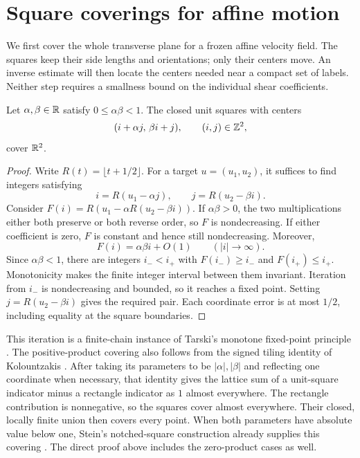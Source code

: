 \section{Square coverings for affine motion}\label{b:linear-coverings}

We first cover the whole transverse plane for a frozen affine velocity
field. The squares keep their side lengths and orientations; only their
centers move. An inverse estimate will then locate the centers needed
near a compact set of labels. Neither step requires a smallness bound on the
individual shear coefficients.

\begin{lemma}\label{b:lattice}
Let $\alpha,\beta\in\mathbb R$ satisfy $0\le\alpha\beta<1$.
The closed unit squares with centers
\[
 (i+\alpha j,\,\beta i+j),\qquad (i,j)\in\mathbb Z^2,
\]
cover $\mathbb R^2$.
\end{lemma}
\begin{proof}
Write $R(t)=\lfloor t+1/2\rfloor$. For a target $u=(u_1,u_2)$,
it suffices to find integers satisfying
\[
 i=R(u_1-\alpha j),\qquad j=R(u_2-\beta i).
\]
Consider $F(i)=R(u_1-\alpha R(u_2-\beta i))$. If
$\alpha\beta>0$, the two multiplications either both preserve or
both reverse order, so $F$ is nondecreasing. If either coefficient
is zero, $F$ is constant and hence still nondecreasing. Moreover,
\[
 F(i)=\alpha\beta i+O(1)\qquad(|i|\to\infty).
\]
Since $\alpha\beta<1$, there are integers $i_-<i_+$ with
$F(i_-)\ge i_-$ and $F(i_+)\le i_+$. Monotonicity makes the
finite integer interval between them invariant. Iteration from $i_-$
is nondecreasing and bounded, so it reaches a fixed point. Setting
$j=R(u_2-\beta i)$ gives the required pair. Each coordinate error
is at most $1/2$, including equality at the square boundaries.
\end{proof}

This iteration is a finite-chain instance of Tarski's monotone
fixed-point principle \cite[Theorem~1]{Tarski1955}. The positive-product
covering also follows from the signed tiling identity of Kolountzakis
\cite[Section~2.3, equations~(17)--(20)]{Kolountzakis1998}.
After taking its parameters to be $|\alpha|,|\beta|$ and reflecting
one coordinate when necessary, that identity gives the lattice sum of
a unit-square indicator minus a rectangle indicator as $1$ almost
everywhere. The rectangle contribution is nonnegative, so the squares
cover almost everywhere. Their closed, locally finite union then
covers every point. When both parameters have absolute value below
one, Stein's notched-square construction already supplies this
covering \cite[Theorem~7 and equations~(13)--(14)]{Kolountzakis1998}.
The direct proof above includes the zero-product cases as well.

